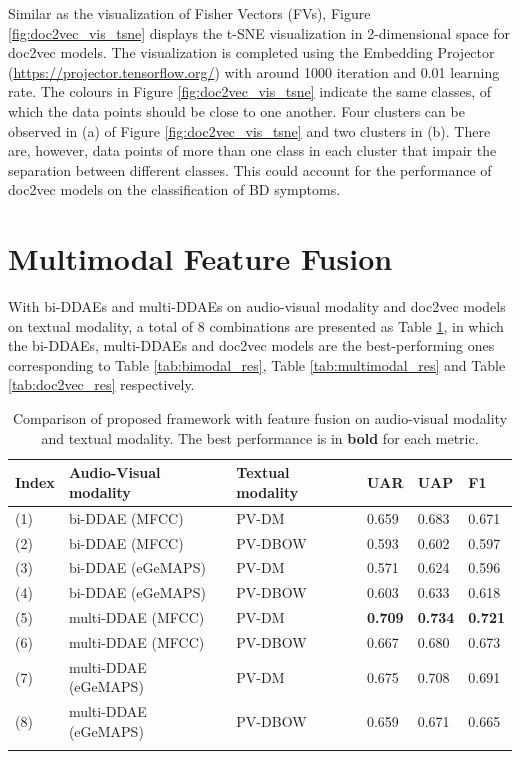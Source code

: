 Similar as the visualization of Fisher Vectors (FVs), Figure \ref{fig:doc2vec_vis_tsne} displays the t-SNE visualization in 2-dimensional space for doc2vec models. The visualization is completed using the Embedding Projector (\url{https://projector.tensorflow.org/}) with around 1000 iteration and 0.01 learning rate. The colours in Figure \ref{fig:doc2vec_vis_tsne} indicate the same classes, of which the data points should be close to one another. Four clusters can be observed in (a) of Figure \ref{fig:doc2vec_vis_tsne} and two clusters in (b). There are, however, data points of more than one class in each cluster that impair the separation between different classes. This could account for the performance of doc2vec models on the classification of BD symptoms.


\section{Multimodal Feature Fusion}

With bi-DDAEs and multi-DDAEs on audio-visual modality and doc2vec models on textual modality, a total of 8 combinations are presented as Table \ref{tab:fusion_res}, in which the bi-DDAEs, multi-DDAEs and doc2vec models are the best-performing ones corresponding to Table \ref{tab:bimodal_res}, Table \ref{tab:multimodal_res} and Table \ref{tab:doc2vec_res} respectively.

\begin{table}[htb]
    \centering
    \small
    \caption{Comparison of proposed framework with feature fusion on audio-visual modality and textual modality. The best performance is in \textbf{bold} for each metric.}
    \begin{tabular}{l|l|l|l|l|l}
    \Xhline{2\arrayrulewidth}
        Index & Audio-Visual modality & Textual modality & UAR & UAP & F1  \\
        \hline
        (1) & bi-DDAE (MFCC) & PV-DM & 0.659 & 0.683 & 0.671 \\
        (2) & bi-DDAE (MFCC) & PV-DBOW & 0.593 & 0.602 & 0.597 \\
        (3) & bi-DDAE (eGeMAPS) & PV-DM & 0.571 & 0.624 & 0.596 \\
        (4) & bi-DDAE (eGeMAPS) & PV-DBOW & 0.603 & 0.633 & 0.618 \\
        (5) & multi-DDAE (MFCC) & PV-DM & \textbf{0.709} & \textbf{0.734} & \textbf{0.721} \\
        (6) & multi-DDAE (MFCC) & PV-DBOW & 0.667 & 0.680 & 0.673 \\
        (7) & multi-DDAE (eGeMAPS) & PV-DM & 0.675 & 0.708 & 0.691 \\
        (8) & multi-DDAE (eGeMAPS) & PV-DBOW & 0.659 & 0.671 & 0.665 \\
    \Xhline{2\arrayrulewidth}
    \end{tabular}
    \label{tab:fusion_res}
\end{table}

